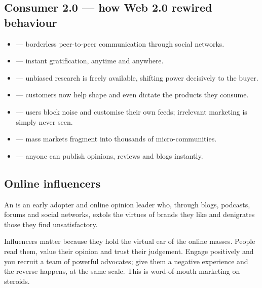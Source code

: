 \documentclass{MMTextbook}
\begin{document}
\subsection{Consumer 2.0 --- how Web 2.0 rewired behaviour}

\begin{itemize}
\item {} --- borderless peer-to-peer communication
      through social networks.
\item {} --- instant gratification, anytime and anywhere.
\item {} --- unbiased research is freely available,
      shifting power decisively to the buyer.
\item {} --- customers now help
      shape and even dictate the products they consume.
\item {} --- users block noise and customise their own
      feeds; irrelevant marketing is simply never seen.
\item {} --- mass markets fragment into thousands of
      micro-communities.
\item {} --- anyone can publish opinions, reviews and blogs
      instantly.
\end{itemize}

\subsection{Online influencers}

\begin{definitionbox}[Influencer]
An  is an early adopter and online opinion leader who,
through blogs, podcasts, forums and social networks, extols the virtues of
brands they like and denigrates those they find unsatisfactory.
\end{definitionbox}

Influencers matter because they hold the virtual ear of the online masses.
People read them, value their opinion and trust their judgement. Engage
positively and you recruit a team of powerful advocates; give them a negative
experience and the reverse happens, at the same scale. This is word-of-mouth
marketing on steroids.
\end{document}
